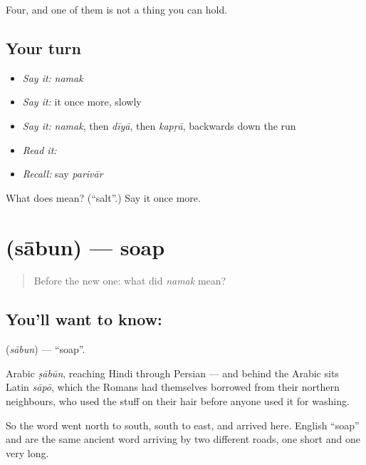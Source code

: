 \begin{grammarlens}[title={What you've built}]
Four, and one of them is not a thing you can hold.
\end{grammarlens}

\subsection*{Your turn}
\begin{itemize}
\raggedright
  \item \emph{Say it:} \emph{namak}
  \item \emph{Say it:} it once more, slowly
  \item \emph{Say it:} \emph{namak}, then \emph{dīyā}, then \emph{kapṛā}, backwards down the run
  \item \emph{Read it:} \textbf{}
  \item \emph{Recall:} say \emph{parivār}
\end{itemize}

\begin{tcolorbox}[breakable,colback=teal!4,colframe=teal!35!black,title={Before you move on}]
What does  mean? (\textquotedblleft{}salt\textquotedblright{}.) Say it once more.
\end{tcolorbox}
\section[\texorpdfstring{\hi{साबुन} (sābun)}{साबुन (sābun)}]{ (sābun) — soap}

\label{lesson:HI-C45-soap}



\begin{quote}
Before the new one: what did \emph{namak} mean?
\end{quote}

\subsection*{You'll want to know: }
\textbf{} (\emph{sābun}) — \textquotedblleft{}soap\textquotedblright{}.

Arabic \emph{ṣābūn}, reaching Hindi through Persian — and behind the Arabic sits Latin \emph{sāpō}, which the Romans had themselves borrowed from their northern neighbours, who used the stuff on their hair before anyone used it for washing.

So the word went north to south, south to east, and arrived here. English \textquotedblleft{}soap\textquotedblright{} and  are the same ancient word arriving by two different roads, one short and one very long.


